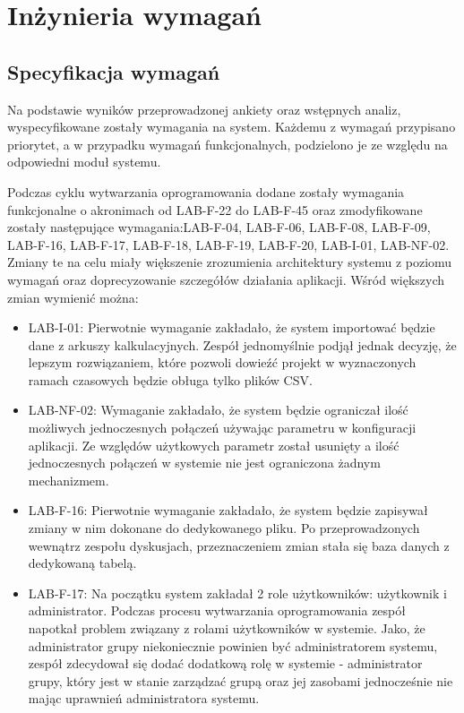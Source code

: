 \chapter{Inżynieria wymagań}

\section{Specyfikacja wymagań}
\label{sec:req_specification}
\par Na podstawie wyników przeprowadzonej ankiety oraz wstępnych analiz, wyspecyfikowane zostały wymagania na system. Każdemu z wymagań przypisano priorytet, a w przypadku wymagań funkcjonalnych, podzielono je ze względu na odpowiedni moduł systemu.
\par Podczas cyklu wytwarzania oprogramowania dodane zostały wymagania funkcjonalne o akronimach od LAB-F-22 do LAB-F-45 oraz zmodyfikowane zostały następujące wymagania:LAB-F-04, LAB-F-06, LAB-F-08, LAB-F-09, LAB-F-16, LAB-F-17, LAB-F-18, LAB-F-19, LAB-F-20, LAB-I-01, LAB-NF-02. Zmiany te na celu miały większenie zrozumienia architektury systemu z poziomu wymagań oraz doprecyzowanie szczegółów działania aplikacji. Wśród większych zmian wymienić można:
\begin{itemize}
    \item LAB-I-01: Pierwotnie wymaganie zakładało, że system importować będzie dane z arkuszy kalkulacyjnych. Zespół jednomyślnie podjął jednak decyzję, że lepszym rozwiązaniem, które pozwoli dowieźć projekt w wyznaczonych ramach czasowych będzie obługa tylko plików \gls{CSV}.
    \item LAB-NF-02: Wymaganie zakładało, że system będzie ograniczał ilość możliwych jednoczesnych połączeń używając parametru w konfiguracji aplikacji. Ze względów użytkowych parametr został usunięty a ilość jednoczesnych połączeń w systemie nie jest ograniczona żadnym mechanizmem.
    \item LAB-F-16: Pierwotnie wymaganie zakładało, że system będzie zapisywał zmiany w nim dokonane do dedykowanego pliku. Po przeprowadzonych wewnątrz zespołu dyskusjach, przeznaczeniem zmian stała się baza danych z dedykowaną tabelą.
    \item LAB-F-17: Na początku system zakładał 2 role użytkowników: użytkownik i administrator. Podczas procesu wytwarzania oprogramowania zespół napotkał problem związany z rolami użytkowników w systemie. Jako, że administrator grupy niekoniecznie powinien być administratorem systemu, zespół zdecydował się dodać dodatkową rolę w systemie - administrator grupy, który jest w stanie zarządzać grupą oraz jej zasobami jednocześnie nie mając uprawnień administratora systemu.
\end{itemize}

